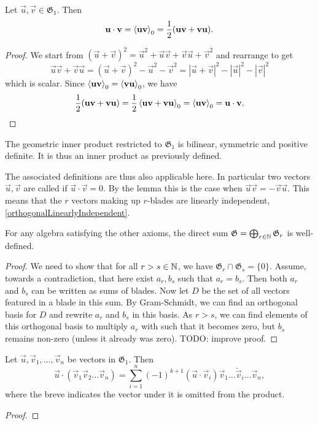 \begin{lemma}
Let $\vec{u}, \vec{v} \in \mathfrak{G}_1$. Then
\[ \boldsymbol{\mathrm{u}}\cdot \boldsymbol{\mathrm{v}} = \left\langle \boldsymbol{\mathrm{u}}\boldsymbol{\mathrm{v}} \right\rangle_0 = \frac{1}{2}(\boldsymbol{\mathrm{u}}\boldsymbol{\mathrm{v}} + \boldsymbol{\mathrm{v}}\boldsymbol{\mathrm{u}}). \]
\end{lemma}
\begin{proof}
We start from $(\vec{u}+\vec{v})^2 = \vec{u}^2 + \vec{u}\vec{v} + \vec{v}\vec{u} + \vec{v}^2$ and rearrange to get
\[ \vec{u}\vec{v} + \vec{v}\vec{u} = (\vec{u}+\vec{v})^2 - \vec{u}^2 - \vec{v}^2 = |\vec{u}+\vec{v}|^2 - |\vec{u}|^2 - |\vec{v}|^2  \]
which is scalar. Since $\left\langle \boldsymbol{\mathrm{u}}\boldsymbol{\mathrm{v}} \right\rangle_0 = \left\langle \boldsymbol{\mathrm{v}}\boldsymbol{\mathrm{u}} \right\rangle_0$, we have
\[ \frac{1}{2}(\boldsymbol{\mathrm{u}}\boldsymbol{\mathrm{v}} + \boldsymbol{\mathrm{v}}\boldsymbol{\mathrm{u}}) = \frac{1}{2}\left\langle \boldsymbol{\mathrm{u}}\boldsymbol{\mathrm{v}} + \boldsymbol{\mathrm{v}}\boldsymbol{\mathrm{u}} \right\rangle_0 = \left\langle \boldsymbol{\mathrm{u}}\boldsymbol{\mathrm{v}} \right\rangle_0 = \boldsymbol{\mathrm{u}}\cdot \boldsymbol{\mathrm{v}}. \]
\end{proof}
\begin{corollary}
The geometric inner product restricted to $\mathfrak{G}_1$ is bilinear, symmetric and positive definite. It is thus an inner product as previously defined.
\end{corollary}
The associated definitions are thus also applicable here. In particular two vectors $\vec{u},\vec{v}$ are called  if $\vec{u}\cdot \vec{v} = 0$. By the lemma this is the case when $\vec{u}\vec{v} = - \vec{v}\vec{u}$. This means that the $r$ vectors making up $r$-blades are linearly independent, \ref{orthogonalLinearlyIndependent}.




\begin{lemma}
For any algebra satisfying the other axioms, the direct sum $\mathfrak{G} = \bigoplus_{r\in\mathbb{N}}\mathfrak{G}_r$ is well-defined.
\end{lemma}
\begin{proof}
We need to show that for all $r>s\in \mathbb{N}$, we have $\mathfrak{G}_r\cap\mathfrak{G}_s = \{0\}$. Assume, towards a contradiction, that here exist $a_r,b_s$ such that $a_r = b_s$. Then both $a_r$ and $b_s$ can be written as sums of blades. Now let $D$ be the set of all vectors featured in a blade in this sum. By Gram-Schmidt, we can find an orthogonal basis for $D$ and rewrite $a_r$ and $b_s$ in this basis. As $r>s$, we can find elements of this orthogonal basis to multiply $a_r$ with such that it becomes zero, but $b_s$ remains non-zero (unless it already was zero). TODO: improve proof.
\end{proof}


\begin{lemma}
Let $\vec{u}, \vec{v}_1,\ldots, \vec{v}_n$ be vectors in $\mathfrak{G}_1$. Then
\[ \vec{u}\cdot (\vec{v}_1 \vec{v}_2 \ldots \vec{v}_n) = \sum_{i=1}^n (-1)^{k+1}(\vec{u}\cdot \vec{v}_i)\vec{v}_1\ldots\breve{\vec{v}}_i\ldots \vec{v}_n, \]
where the breve indicates the vector under it is omitted from the product.
\end{lemma}
\begin{proof}

\end{proof}

